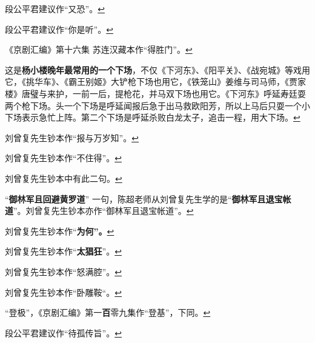 \item
  \leavevmode\hypertarget{fn424}{}%
  段公平君建议作``又恐''。\protect\hyperlink{fnref424}{↩}
\item
  \leavevmode\hypertarget{fn425}{}%
  段公平君建议作``你是听''。\protect\hyperlink{fnref425}{↩}
\item
  \leavevmode\hypertarget{fn426}{}%
  《京剧汇编》第十六集
  苏连汉藏本作``得胜门''。\protect\hyperlink{fnref426}{↩}
\item
  \leavevmode\hypertarget{fn427}{}%
  这是\textbf{杨小楼晚年最常用的一个下场}，不仅《下河东》、《阳平关》、《战宛城》等戏用它，《挑华车》、《霸王别姬》大铲枪下场也用它，《铁笼山》姜维与司马师，《贾家楼》唐璧与来护，一前一后，提枪花，并马双下场也用它。《下河东》呼延寿廷耍两个枪下场。头一个下场是呼延闻报后急于出马救欧阳芳，所以上马后只耍一个小下场表示急忙上阵。第二个下场是呼延杀败白龙太子，追击一程，用大下场。\protect\hyperlink{fnref427}{↩}
\item
  \leavevmode\hypertarget{fn428}{}%
  刘曾复先生钞本作``报与万岁知''。\protect\hyperlink{fnref428}{↩}
\item
  \leavevmode\hypertarget{fn429}{}%
  刘曾复先生钞本作``不住得''。\protect\hyperlink{fnref429}{↩}
\item
  \leavevmode\hypertarget{fn430}{}%
  刘曾复先生钞本中有此二句。\protect\hyperlink{fnref430}{↩}
\item
  \leavevmode\hypertarget{fn431}{}%
  ``\textbf{御林军且回避黄罗道}''
  一句，陈超老师从刘曾复先生学的是``\textbf{御林军且退宝帐道}''。刘曾复先生钞本亦作``御林军且退宝帐道''。\protect\hyperlink{fnref431}{↩}
\item
  \leavevmode\hypertarget{fn432}{}%
  刘曾复先生钞本作``\textbf{为何''。}\protect\hyperlink{fnref432}{↩}
\item
  \leavevmode\hypertarget{fn433}{}%
  刘曾复先生钞本作``\textbf{太猖狂}''。\protect\hyperlink{fnref433}{↩}
\item
  \leavevmode\hypertarget{fn434}{}%
  刘曾复先生钞本作``怒满腔''。\protect\hyperlink{fnref434}{↩}
\item
  \leavevmode\hypertarget{fn435}{}%
  刘曾复先生钞本作``卧雕鞍``。\protect\hyperlink{fnref435}{↩}
\item
  \leavevmode\hypertarget{fn436}{}%
  ``登极''，《京剧汇编》第一\textbf{百}零九集作``登基''，下同。\protect\hyperlink{fnref436}{↩}
\item
  \leavevmode\hypertarget{fn437}{}%
  段公平君建议作``待孤传旨''。\protect\hyperlink{fnref437}{↩}
\item
  \leavevmode\hypertarget{fn438}{}%
